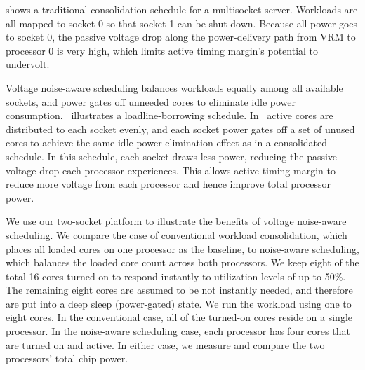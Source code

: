  shows a traditional consolidation schedule for a multisocket server. Workloads are all mapped to socket 0 so that socket 1 can be shut down. Because all power goes to socket 0, the passive voltage drop along the power-delivery path from VRM to processor 0 is very high, which limits active timing margin's potential to undervolt.

Voltage noise-aware scheduling balances workloads equally among all available sockets, and power gates off unneeded cores to eliminate idle power consumption.~ illustrates a loadline-borrowing schedule. In~ active cores are distributed to each socket evenly, and each socket power gates off a set of unused cores to achieve the same idle power elimination effect as in a consolidated schedule. In this schedule, each socket draws less power, reducing the passive voltage drop each processor experiences. This allows active timing margin to reduce more voltage from each processor and hence improve total processor power.

We use our two-socket platform to illustrate the benefits of voltage noise-aware scheduling. We compare the case of conventional workload consolidation, which places all loaded cores on one processor as the baseline, to noise-aware scheduling, which balances the loaded core count across both processors. We keep eight of the total 16 cores turned on to respond instantly to utilization levels of up to 50\%. The remaining eight cores are assumed to be not instantly needed, and therefore are put into a deep sleep (power-gated) state. We run the workload using one to eight cores. In the conventional case, all of the turned-on cores reside on a single processor. In the noise-aware scheduling case, each processor has four cores that are turned on and active. In either case, we measure and compare the two processors' total chip power.

